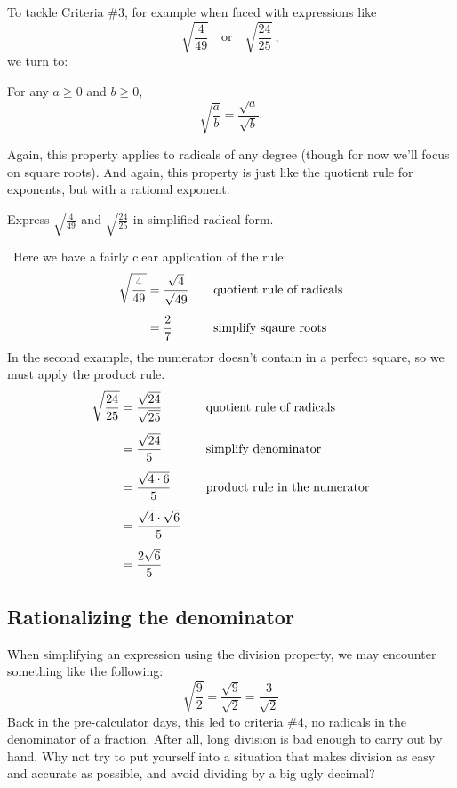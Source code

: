 To tackle Criteria \#3, for example when faced with expressions like \[\sqrt{\frac{4}{49}} \quad\text{or}\quad \sqrt{\frac{24}{25}}~,\]we turn to:

\begin{boxdef}
For any $a \geq 0$ and $b \geq 0$, \[\sqrt{\frac{a}{b}} = \dfrac{\sqrt{a}}{\sqrt{b}}.\]
\end{boxdef}

Again, this property applies to radicals of any degree (though for now we'll focus on square roots). And again, this property is just like the quotient rule for exponents, but with a rational exponent.

\begin{boxex}
Express $\sqrt{\frac{4}{49}}$ and $\sqrt{\frac{24}{25}}$ in simplified radical form.

\exsoln\ Here we have a fairly clear application of the rule:
\[\begin{aligned}
\sqrt{\frac{4}{49}}	&= \frac{\sqrt{4}}{\sqrt{49}}
&& \text{\quad quotient rule of radicals}\\[1ex]
&= \frac{2}{7}
&& \text{\quad simplify sqaure roots}\\
\end{aligned}
\]
In the second example, the numerator doesn't contain in a perfect square, so we must apply the product rule.
\[\begin{aligned}
\sqrt{\frac{24}{25}}	&= \frac{\sqrt{24}}{\sqrt{25}}
&& \text{\quad quotient rule of radicals}\\[1ex]
&= \frac{\sqrt{24}}{5}
&& \text{\quad simplify denominator}\\[1ex]
&= \frac{\sqrt{4\cdot6}}{5}
&& \text{\quad product rule in the numerator}\\[1ex]
&= \frac{\sqrt{4}\cdot\sqrt{6}}{5}\\[1ex]
&= \frac{2\sqrt{6}}{5}
\end{aligned}
\]
\end{boxex}

\subsection{Rationalizing the denominator}

When simplifying an expression using the division property, we may encounter something like the following: \[\sqrt{\frac{9}{2}} = \frac{\sqrt{9}}{\sqrt{2}} = \frac{3}{\sqrt{2}}\]
Back in the pre-calculator days, this led to criteria \#4, no radicals in the denominator of a fraction. After all, long division is bad enough to carry out by hand. Why not try to put yourself into a situation that makes division as easy and accurate as possible, and avoid dividing by a big ugly decimal?

